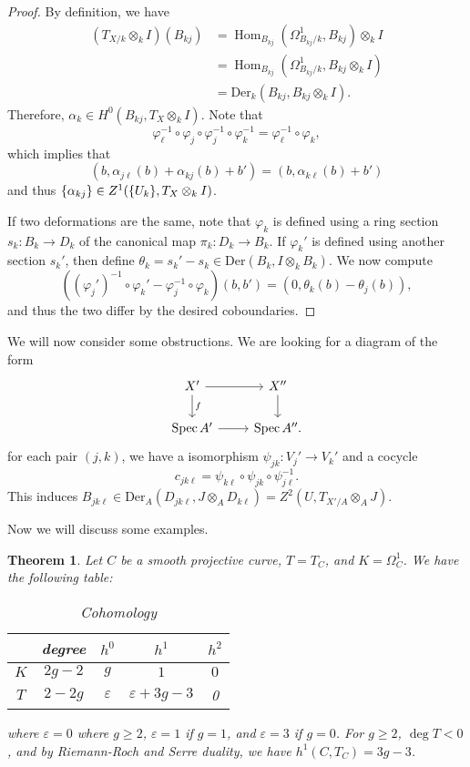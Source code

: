 \documentclass[leqno, openany]{memoir}
\newtheorem{thm}{Theorem}[section]
\theoremstyle{definition}
\theoremstyle{remark}
\theoremstyle{plain}
\theoremstyle{definition}
\theoremstyle{remark}
\newcommand{\ep}{\varepsilon}
\newcommand{\mr}[1]{\mathrm{#1}}
\DeclareMathOperator{\Hom}{Hom}
\DeclareMathOperator{\Spec}{Spec}
\begin{document}
\begin{proof}
    By definition, we have
    \begin{align*} 
        (T_{X/k} \otimes_k I)(B_{kj}) &= {\Hom_{B_{kj}}(\Omega^1_{B_{kj}/k}, B_{kj}) \otimes_k I} \\ 
        &= {\Hom_{B_{kj}}(\Omega^1_{B_{kj}/k}, B_{kj} \otimes_k I)} \\ 
        &= \mr{Der}_k(B_{kj}, B_{kj} \otimes_k I).
    \end{align*}
    Therefore, $\alpha_k \in H^0(B_{kj}, T_X \otimes_k I)$. Note that
    \[ \varphi_{\ell}^{-1} \circ \varphi_j \circ \varphi_j^{-1} \circ \varphi_{k}^{-1} = \varphi_{\ell}^{-1} \circ \varphi_k, \]
    which implies that
    \[ (b, \alpha_{j\ell}(b) + \alpha_{kj}(b) + b') = (b, \alpha_{k\ell}(b) + b') \]
    and thus $\qty{\alpha_{kj}} \in Z^1(\qty{U_k}, T_X \otimes_k I)$.

    If two deformations are the same, note that $\varphi_k$ is defined using a ring section $s_k \colon B_k \to D_k$ of the canonical map $\pi_k \colon D_k \to B_k$. If $\varphi_k'$ is defined using another section $s_k'$, then define $\theta_k = s_k' - s_k \in \mr{Der}(B_k, I \otimes_k B_k)$. We now compute
    \[ ({(\varphi_j')}^{-1} \circ \varphi_k' - \varphi_j^{-1} \circ \varphi_k)(b, b') = (0, \theta_k(b) - \theta_j(b)), \]
    and thus the two differ by the desired coboundaries.
\end{proof}

We will now consider some obstructions. We are looking for a diagram of the form
\begin{equation*}
\begin{tikzcd}
    X' \ar{r} \ar{d}{f} & X'' \ar{d} \\
    \Spec A' \ar{r} & \Spec A''.
\end{tikzcd}
\end{equation*}
for each pair $(j, k)$, we have a isomorphism $\psi_{jk} \colon V_j' \to V_k'$ and a cocycle
\[ c_{jk\ell} = \psi_{k\ell} \circ \psi_{jk} \circ \psi_{j\ell}^{-1}. \]
This induces $B_{jk\ell} \in \mr{Der}_A(D_{jk\ell}, J \otimes_A D_{k\ell}) = Z^2(U, T_{X'/A} \otimes_A J)$.

Now we will discuss some examples.
\begin{thm}
    Let $C$ be a smooth projective curve, $T = T_C$, and $K = \Omega^1_C$. We have the following table:
    \begin{table}[H]
        \centering
        \caption{Cohomology}
        \label{tab:label}
        \begin{tabular}{ccccc}
        \toprule
            & degree & $h^0$ & $h^1$ & $h^2$ \\
            \midrule
            $K$ & $2g-2$ & $g$ & $1$ & $0$ \\
            $T$ & $2-2g$ & $\ep$ & $\ep + 3g-3$ & 0 \\
            \bottomrule
        \end{tabular}
        where $\ep = 0$ where $g \geq 2$, $\ep = 1$ if $g = 1$, and $\ep = 3$ if $g = 0$. For $g \geq 2$, $\deg T < 0$, and by Riemann-Roch and Serre duality, we have $h^1(C, T_C) = 3g-3$.
    \end{table}
\end{thm}
\end{document}

